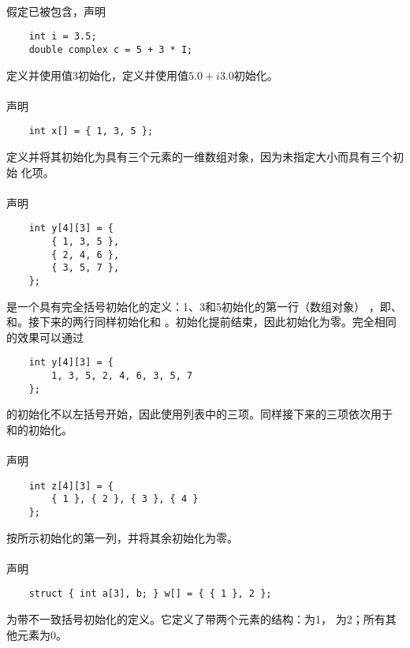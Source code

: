 {\paragraph{}
\ex 假定已被包含，声明
\begin{lstlisting}
    int i = 3.5;
    double complex c = 5 + 3 * I;
\end{lstlisting}
定义并使用值3初始化，定义并使用值$5.0+i3.0$初始化。

\paragraph{}
\ex 声明
\begin{lstlisting}
    int x[] = { 1, 3, 5 };
\end{lstlisting}
定义并将其初始化为具有三个元素的一维数组对象，因为未指定大小而具有三个初始
化项。

\paragraph{}
\ex 声明
\begin{lstlisting}
    int y[4][3] = {
        { 1, 3, 5 },
        { 2, 4, 6 },
        { 3, 5, 7 },
    };
\end{lstlisting}
是一个具有完全括号初始化的定义：1、3和5初始化的第一行（数组对象）
，即、和。接下来的两行同样初始化和
。初始化提前结束，因此初始化为零。完全相同的效果可以通过
\begin{lstlisting}
    int y[4][3] = {
        1, 3, 5, 2, 4, 6, 3, 5, 7
    };
\end{lstlisting}
的初始化不以左括号开始，因此使用列表中的三项。同样接下来的三项依次用于
和的初始化。

\paragraph{}
\ex 声明
\begin{lstlisting}
    int z[4][3] = {
        { 1 }, { 2 }, { 3 }, { 4 }
    };
\end{lstlisting}
按所示初始化的第一列，并将其余初始化为零。

\paragraph{}
\ex 声明
\begin{lstlisting}
    struct { int a[3], b; } w[] = { { 1 }, 2 };
\end{lstlisting}
为带不一致括号初始化的定义。它定义了带两个元素的结构：为1，
为2；所有其他元素为0。

}
